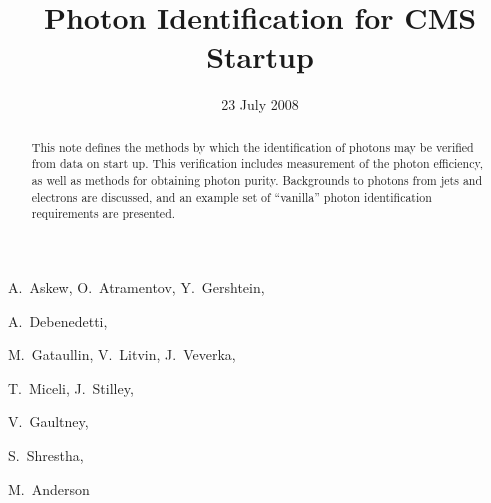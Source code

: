 \documentclass{cmspaper}
\begin{document}

\begin{titlepage}

   \date{23 July 2008}

  \title{Photon Identification for CMS Startup}

  \begin{Authlist}
    A.~Askew, O.~Atramentov, Y.~Gershtein,

    A.~Debenedetti,

    M.~Gataullin, V.~Litvin, J.~Veverka, 

    T.~Miceli, J.~Stilley,

    V.~Gaultney,

    S.~Shrestha,

    M.~Anderson

  \end{Authlist}


  \begin{abstract}
This note defines the methods by which the identification of photons may be verified from data
on start up.  This verification includes measurement of the photon efficiency, as well as methods
for obtaining photon purity.  Backgrounds to photons from jets and electrons are discussed, and an
example set of ``vanilla'' photon identification requirements are presented. 
  \end{abstract} 

  
\end{titlepage}
\end{document}
